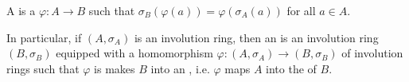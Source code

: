 \begin{definition} \label{definition:homomorphism_of_involution_rings}
    A  is a  $\varphi: A \to B$ such that $\sigma_B(\varphi(a)) = \varphi(\sigma_A(a))$ for all $a \in A$.

    In particular, if $(A,\sigma_A)$ is an involution ring, then an  is an involution ring $(B,\sigma_B)$ equipped with a homomorphism $\varphi: ( A, \sigma_A) \to (B,\sigma_B)$ of involution rings such that $\varphi$ is makes $B$ into an , i.e. $\varphi$ maps $A$ into the  of $B$.
\end{definition}